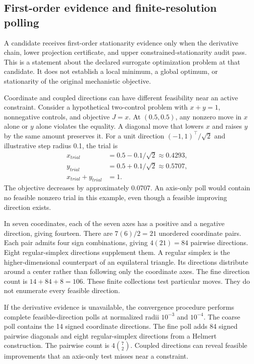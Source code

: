 \subsection{First-order evidence and finite-resolution polling}

A candidate receives first-order stationarity evidence only when the derivative chain, lower projection certificate, and upper constrained-stationarity audit pass. This is a statement about the declared surrogate optimization problem at that candidate. It does not establish a local minimum, a global optimum, or stationarity of the original mechanistic objective.

Coordinate and coupled directions can have different feasibility near an active constraint. Consider a hypothetical two-control problem with $x+y=1$, nonnegative controls, and objective $J=x$. At $(0.5,0.5)$, any nonzero move in $x$ alone or $y$ alone violates the equality. A diagonal move that lowers $x$ and raises $y$ by the same amount preserves it. For a unit direction $(-1,1)^\top/\sqrt2$ and illustrative step radius 0.1, the trial is
\[
\begin{aligned}
x_{trial}&=0.5-0.1/\sqrt2\approx0.4293,\\
y_{trial}&=0.5+0.1/\sqrt2\approx0.5707,\\
x_{trial}+y_{trial}&=1.
\end{aligned}
\]
The objective decreases by approximately 0.0707. An axis-only poll would contain no feasible nonzero trial in this example, even though a feasible improving direction exists.

In seven coordinates, each of the seven axes has a positive and a negative direction, giving fourteen. There are $7(6)/2=21$ unordered coordinate pairs. Each pair admits four sign combinations, giving $4(21)=84$ pairwise directions. Eight regular-simplex directions supplement them. A regular simplex is the higher-dimensional counterpart of an equilateral triangle. Its directions distribute around a center rather than following only the coordinate axes. The fine direction count is $14+84+8=106$. These finite collections test particular moves. They do not enumerate every feasible direction.

If the derivative evidence is unavailable, the convergence procedure performs complete feasible-direction polls at normalized radii $10^{-3}$ and $10^{-4}$. The coarse poll contains the 14 signed coordinate directions. The fine poll adds 84 signed pairwise diagonals and eight regular-simplex directions from a Helmert construction. The pairwise count is $4\binom72$. Coupled directions can reveal feasible improvements that an axis-only test misses near a constraint.

